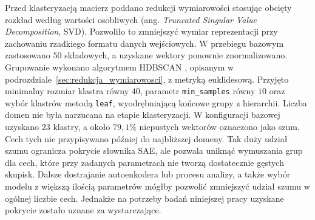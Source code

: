 Przed klasteryzacją macierz poddano redukcji wymiarowości stosując obcięty rozkład według wartości osobliwych (ang. \textit{Truncated Singular Value Decomposition}, SVD). Pozwoliło to zmniejszyć wymiar reprezentacji przy zachowaniu rzadkiego formatu danych wejściowych. W przebiegu bazowym zastosowano $50$ składowych, a uzyskane wektory ponownie znormalizowano. Grupowanie wykonano algorytmem HDBSCAN \cite{campello_2013_hdbscan,mcinnes_2017_hdbscan}, opisanym w podrozdziale~\ref{sec:redukcja_wymiarowosci}, z metryką euklidesową. Przyjęto minimalny rozmiar klastra równy $40$, parametr \texttt{min\_samples} równy $10$ oraz wybór klastrów metodą \texttt{leaf}, wyodrębniającą końcowe grupy z hierarchii. Liczba domen nie była narzucana na etapie klasteryzacji. \newline
W konfiguracji bazowej uzyskano $23$ klastry, a około $79{,}1\%$ niepustych wektorów oznaczono jako szum. Cech tych nie przypisywano później do najbliższej domeny. Tak duży udział szumu ogranicza pokrycie słownika SAE, ale pozwala uniknąć wymuszania grup dla cech, które przy zadanych parametrach nie tworzą dostatecznie gęstych skupisk. Dalsze dostrajanie autoenkodera lub procesu analizy, a także wybór modelu z większą ilością parametrów mógłby pozwolić zmniejszyć udział szumu w ogólnej liczbie cech. Jednakże na potrzeby badań niniejszej pracy uzyskane pokrycie zostało uznane za wystarczające.

